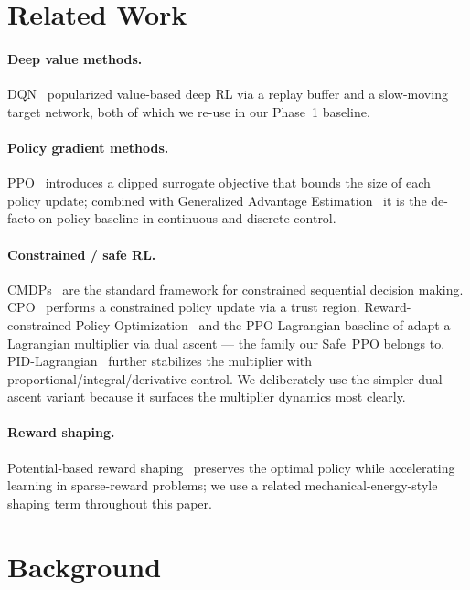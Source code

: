 \documentclass{article}
\begin{document}
\section{Related Work}
\label{sec:related}

\paragraph{Deep value methods.} DQN~\citep{mnih2015dqn} popularized value-based deep RL via a
replay buffer and a slow-moving target network, both of which we re-use in our Phase~1 baseline.

\paragraph{Policy gradient methods.} PPO~\citep{schulman2017ppo} introduces a clipped surrogate
objective that bounds the size of each policy update; combined with Generalized Advantage
Estimation~\citep{schulman2016gae} it is the de-facto on-policy baseline in continuous and
discrete control.

\paragraph{Constrained / safe RL.} CMDPs~\citep{altman1999cmdp} are the standard framework for
constrained sequential decision making. CPO~\citep{achiam2017cpo} performs a constrained policy
update via a trust region. Reward-constrained Policy Optimization~\citep{tessler2018reward} and
the PPO-Lagrangian baseline of \citet{ray2019benchmarking} adapt a Lagrangian multiplier via
dual ascent --- the family our Safe~PPO belongs to. PID-Lagrangian~\citep{stooke2020responsive}
further stabilizes the multiplier with proportional/integral/derivative control. We deliberately
use the simpler dual-ascent variant because it surfaces the multiplier dynamics most clearly.

\paragraph{Reward shaping.} Potential-based reward shaping~\citep{ng1999rewardshaping} preserves
the optimal policy while accelerating learning in sparse-reward problems; we use a related
mechanical-energy-style shaping term throughout this paper.


\section{Background}
\label{sec:background}
\end{document}
